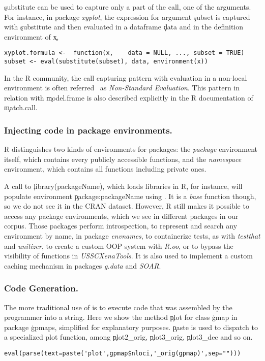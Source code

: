 \documentclass[review,screen,acmsmall,anonymous=true]{acmart}
\begin{document}
\c{substitute} can be used to capture only a part of the call, \ie one of the arguments. For instance, in package \emph{xyplot}, the expression for argument \c{subset} is captured with \c{substitute} and then evaluated in a dataframe \c{data} and in the definition environment of \c{x}.
\begin{lstlisting}
xyplot.formula <-  function(x,    data = NULL, ..., subset = TRUE)
subset <- eval(substitute(subset), data, environment(x))
\end{lstlisting}


In the R community, the call capturing pattern with evaluation in a non-local environment is often referred~\cite{hadley} as \emph{Non-Standard Evaluation}. This pattern in relation with \c{model.frame} is also described explicitly in the R documentation of \c{match.call}.

\subsubsection{Injecting code in package environments.} R distinguishes two kinds of environments for packages: the \emph{package} environment itself, which contains every publicly accessible functions, and the \emph{namespace} environment, which contains all functions including private ones.

 A call to \c{library(packageName)}, which loads libraries in R, for instance, will
populate environment \c{package:packageName} using \eval. It is a \emph{base} function
though, so we do not see it in the CRAN dataset. However, R still makes it
possible to access any package environments, which we see in
\packageNbPackageEnvPackages different packages in our corpus. Those packages perform
introspection, to represent and search any environment by name, in package
\emph{envnames}, to containerize tests, as with \emph{testthat} and
\emph{unitizer}, to create a custom OOP system with \emph{R.oo}, or to bypass the visibility of functions in \emph{USSCXenaTools}. It is also used to
implement a custom caching mechanism in packages \emph{g.data} and \emph{SOAR}.

\subsubsection{Code Generation.} The more traditional use of \eval is to execute code
that was assembled by the programmer into a string. Here we show the method
\c{plot} for class \c{gmap} in package \c{gpmaps}, simplified for
explanatory purposes.   \c{paste} is used to dispatch to a specialized plot function, among \c{plot2\_orig},  \c{plot3\_orig}, \c{plot3\_dec} and so on.
\begin{lstlisting}
eval(parse(text=paste('plot',gpmap$nloci,'_orig(gpmap)',sep="")))
\end{lstlisting} 
\end{document}
